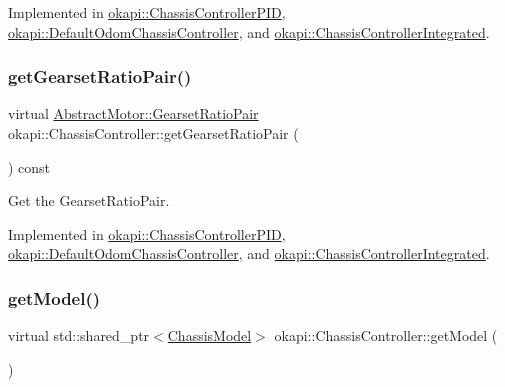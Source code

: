 Implemented in \mbox{\hyperlink{classokapi_1_1ChassisControllerPID_a75f4e1b26f2440ac4066fd740dee7b13}{okapi\+::\+Chassis\+Controller\+P\+ID}}, \mbox{\hyperlink{classokapi_1_1DefaultOdomChassisController_afa07913b30d47c790fcdce8c2b85a468}{okapi\+::\+Default\+Odom\+Chassis\+Controller}}, and \mbox{\hyperlink{classokapi_1_1ChassisControllerIntegrated_a6bbab5d22753736b0507d5fd4deb3982}{okapi\+::\+Chassis\+Controller\+Integrated}}.

\mbox{\label{classokapi_1_1ChassisController_aa19351888b997d4a6596dac24520ebff}} 
\subsubsection{\texorpdfstring{getGearsetRatioPair()}{getGearsetRatioPair()}}
{\footnotesize\ttfamily virtual \mbox{\hyperlink{structokapi_1_1AbstractMotor_1_1GearsetRatioPair}{Abstract\+Motor\+::\+Gearset\+Ratio\+Pair}} okapi\+::\+Chassis\+Controller\+::get\+Gearset\+Ratio\+Pair (\begin{DoxyParamCaption}{ }\end{DoxyParamCaption}) const\hspace{0.3cm}{\ttfamily [pure virtual]}}

Get the Gearset\+Ratio\+Pair. 

Implemented in \mbox{\hyperlink{classokapi_1_1ChassisControllerPID_a50673f2911c969e2f6e89b02a29ce582}{okapi\+::\+Chassis\+Controller\+P\+ID}}, \mbox{\hyperlink{classokapi_1_1DefaultOdomChassisController_a6912dbe99776f79fb3a6990e2fbea2ff}{okapi\+::\+Default\+Odom\+Chassis\+Controller}}, and \mbox{\hyperlink{classokapi_1_1ChassisControllerIntegrated_a42cab9878235cdb4bea46e69f7ccd75d}{okapi\+::\+Chassis\+Controller\+Integrated}}.

\mbox{\label{classokapi_1_1ChassisController_a1971d4b54b61718437824c026aca53c9}} 
\subsubsection{\texorpdfstring{getModel()}{getModel()}}
{\footnotesize\ttfamily virtual std\+::shared\+\_\+ptr$<$\mbox{\hyperlink{classokapi_1_1ChassisModel}{Chassis\+Model}}$>$ okapi\+::\+Chassis\+Controller\+::get\+Model (\begin{DoxyParamCaption}{ }\end{DoxyParamCaption})\hspace{0.3cm}{\ttfamily [pure virtual]}}

